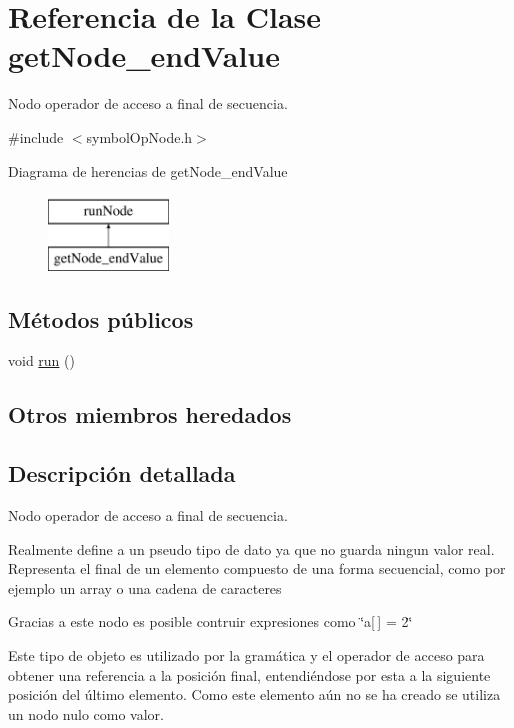 \hypertarget{classgetNode__endValue}{\section{Referencia de la Clase get\-Node\-\_\-end\-Value}
\label{classgetNode__endValue}
}


Nodo operador de acceso a final de secuencia.  




{\ttfamily \#include $<$symbol\-Op\-Node.\-h$>$}

Diagrama de herencias de get\-Node\-\_\-end\-Value\begin{figure}[H]
\begin{center}
\leavevmode
\includegraphics[height=2.000000cm]{classgetNode__endValue}
\end{center}
\end{figure}
\subsection*{Métodos públicos}
\begin{DoxyCompactItemize}
\item 
void \hyperlink{classgetNode__endValue_aa6e13ab26b17eafe1773c096036f843f}{run} ()
\end{DoxyCompactItemize}
\subsection*{Otros miembros heredados}


\subsection{Descripción detallada}
Nodo operador de acceso a final de secuencia. 

Realmente define a un pseudo tipo de dato ya que no guarda ningun valor real. Representa el final de un elemento compuesto de una forma secuencial, como por ejemplo un array o una cadena de caracteres

Gracias a este nodo es posible contruir expresiones como \char`\"{}a\mbox{[}$\,$\mbox{]} = 2\char`\"{}

Este tipo de objeto es utilizado por la gramática y el operador de acceso para obtener una referencia a la posición final, entendiéndose por esta a la siguiente posición del último elemento. Como este elemento aún no se ha creado se utiliza un nodo nulo como valor. 

